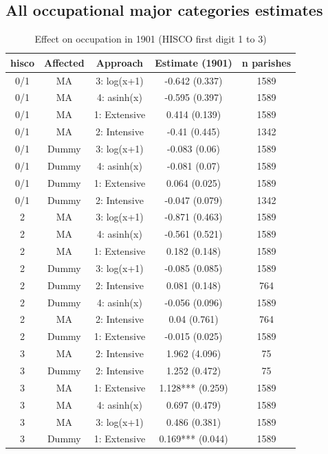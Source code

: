 \FloatBarrier
\subsection{All occupational major categories estimates} \label{all_occ_results}

\begin{table}
    \centering
    \caption{Effect on occupation in 1901 (HISCO first digit 1 to 3)} \label{tab:occ1}
    \footnotesize
    \begin{tabular}{ccccc}
\toprule
hisco & Affected & Approach & Estimate (1901) & n parishes\\
\midrule
0/1 & MA & 3: log(x+1) & -0.642 (0.337) & 1589\\
0/1 & MA & 4: asinh(x) & -0.595 (0.397) & 1589\\
0/1 & MA & 1: Extensive & 0.414 (0.139) & 1589\\
0/1 & MA & 2: Intensive & -0.41 (0.445) & 1342\\
0/1 & Dummy & 3: log(x+1) & -0.083 (0.06) & 1589\\
0/1 & Dummy & 4: asinh(x) & -0.081 (0.07) & 1589\\
0/1 & Dummy & 1: Extensive & 0.064 (0.025) & 1589\\
0/1 & Dummy & 2: Intensive & -0.047 (0.079) & 1342\\
2 & MA & 3: log(x+1) & -0.871 (0.463) & 1589\\
2 & MA & 4: asinh(x) & -0.561 (0.521) & 1589\\
2 & MA & 1: Extensive & 0.182 (0.148) & 1589\\
2 & Dummy & 3: log(x+1) & -0.085 (0.085) & 1589\\
2 & Dummy & 2: Intensive & 0.081 (0.148) & 764\\
2 & Dummy & 4: asinh(x) & -0.056 (0.096) & 1589\\
2 & MA & 2: Intensive & 0.04 (0.761) & 764\\
2 & Dummy & 1: Extensive & -0.015 (0.025) & 1589\\
3 & MA & 2: Intensive & 1.962 (4.096) & 75\\
3 & Dummy & 2: Intensive & 1.252 (0.472) & 75\\
3 & MA & 1: Extensive & 1.128*** (0.259) & 1589\\
3 & MA & 4: asinh(x) & 0.697 (0.479) & 1589\\
3 & MA & 3: log(x+1) & 0.486 (0.381) & 1589\\
3 & Dummy & 1: Extensive & 0.169*** (0.044) & 1589\\

\end{tabular}
\end{table}
